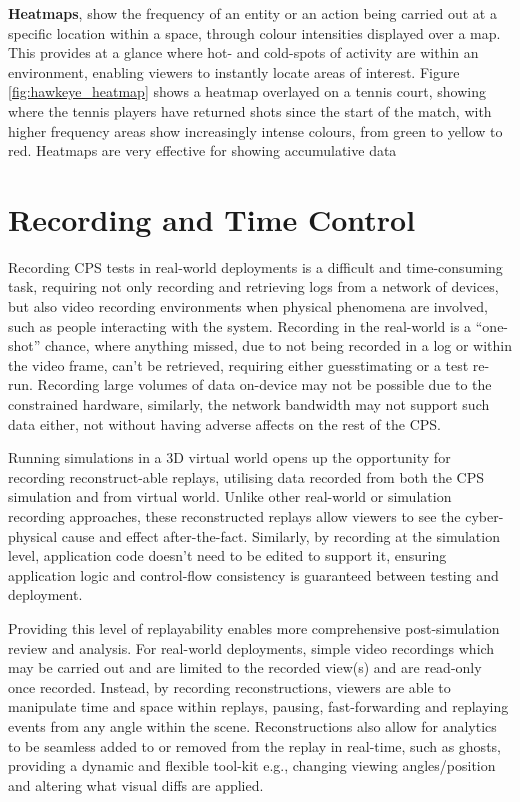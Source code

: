 \textbf{Heatmaps}, show the frequency of an entity or an action being carried out at a specific location within a space, through colour intensities displayed over a map. This provides at a glance where hot- and cold-spots of activity are within an environment, enabling viewers to instantly locate areas of interest. Figure \ref{fig:hawkeye_heatmap} shows a heatmap overlayed on a tennis court, showing where the tennis players have returned shots since the start of the match, with higher frequency areas show increasingly intense colours, from green to yellow to red. Heatmaps are very effective for showing accumulative data  


\section{Recording and Time Control}
\label{sec:recording}
Recording CPS tests in real-world deployments is a difficult and time-consuming task, requiring not only recording and retrieving logs from a network of devices, but also video recording environments when physical phenomena are involved, such as people interacting with the system. Recording in the real-world is a ``one-shot'' chance, where anything missed, due to not being recorded in a log or within the video frame, can't be retrieved, requiring either guesstimating or a test re-run. Recording large volumes of data on-device may not be possible due to the constrained hardware, similarly, the network bandwidth may not support such data either, not without having adverse affects on the rest of the CPS. 

Running simulations in a 3D virtual world opens up the opportunity for recording reconstruct-able replays, utilising data recorded from both the CPS simulation and from virtual world. Unlike other real-world or simulation recording approaches, these reconstructed replays allow viewers to see the cyber-physical cause and effect after-the-fact. Similarly, by recording at the simulation level, application code doesn't need to be edited to support it, ensuring application logic and control-flow consistency is guaranteed between testing and deployment.

Providing this level of replayability enables more comprehensive post-simulation review and analysis. For real-world deployments, simple video recordings which may be carried out and are limited to the recorded view(s) and are read-only once recorded. Instead, by recording reconstructions, viewers are able to manipulate time and space within replays, pausing, fast-forwarding and replaying events from any angle within the scene. Reconstructions also allow for analytics to be seamless added to or removed from the replay in real-time, such as ghosts, providing a dynamic and flexible tool-kit e.g., changing viewing angles/position and altering what visual diffs are applied.

